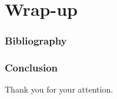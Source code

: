 \section{Wrap-up}
\begin{frame}
  \frametitle{Bibliography}
  \printbibliography
\end{frame}
\begin{frame}
  \frametitle{Conclusion}
  \begin{center}
    \Huge Thank you for your attention.
  \end{center}
\end{frame}